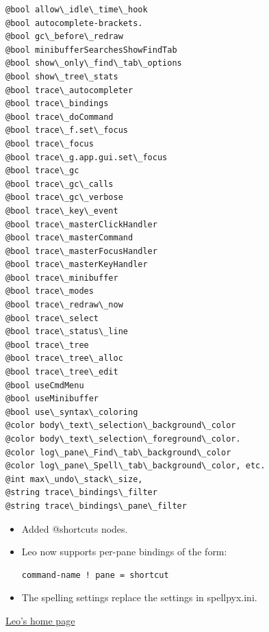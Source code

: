 \documentclass[a4paper,10pt,english]{sphinxmanual}
\begin{document}
\begin{Verbatim}[commandchars=\\\{\}]
@bool allow\_idle\_time\_hook
@bool autocomplete-brackets.
@bool gc\_before\_redraw
@bool minibufferSearchesShowFindTab
@bool show\_only\_find\_tab\_options
@bool show\_tree\_stats
@bool trace\_autocompleter
@bool trace\_bindings
@bool trace\_doCommand
@bool trace\_f.set\_focus
@bool trace\_focus
@bool trace\_g.app.gui.set\_focus
@bool trace\_gc
@bool trace\_gc\_calls
@bool trace\_gc\_verbose
@bool trace\_key\_event
@bool trace\_masterClickHandler
@bool trace\_masterCommand
@bool trace\_masterFocusHandler
@bool trace\_masterKeyHandler
@bool trace\_minibuffer
@bool trace\_modes
@bool trace\_redraw\_now
@bool trace\_select
@bool trace\_status\_line
@bool trace\_tree
@bool trace\_tree\_alloc
@bool trace\_tree\_edit
@bool useCmdMenu
@bool useMinibuffer
@bool use\_syntax\_coloring
@color body\_text\_selection\_background\_color
@color body\_text\_selection\_foreground\_color.
@color log\_pane\_Find\_tab\_background\_color
@color log\_pane\_Spell\_tab\_background\_color, etc.
@int max\_undo\_stack\_size,
@string trace\_bindings\_filter
@string trace\_bindings\_pane\_filter
\end{Verbatim}
\begin{itemize}
\item {} 
Added @shortcuts nodes.

\item {} 
Leo now supports per-pane bindings of the form:

\begin{Verbatim}[commandchars=\\\{\}]
command-name ! pane = shortcut
\end{Verbatim}

\item {} 
The spelling settings replace the settings in spellpyx.ini.

\end{itemize}

\href{http://webpages.charter.net/edreamleo/front.html}{Leo's home page}



\renewcommand{\indexname}{Index}
\printindex
\end{document}
